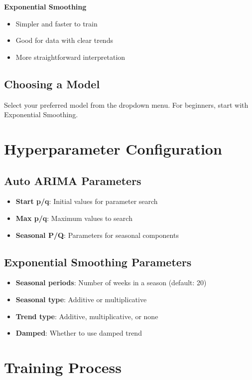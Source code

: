\textbf{Exponential Smoothing}
\begin{itemize}
	\item Simpler and faster to train
	\item Good for data with clear trends
	\item More straightforward interpretation
\end{itemize}

\subsection{Choosing a Model}
Select your preferred model from the dropdown menu. For beginners, start with Exponential Smoothing.

\section{Hyperparameter Configuration}

\subsection{Auto ARIMA Parameters}
\begin{itemize}
	\item \textbf{Start p/q}: Initial values for parameter search
	\item \textbf{Max p/q}: Maximum values to search
	\item \textbf{Seasonal P/Q}: Parameters for seasonal components
\end{itemize}

\subsection{Exponential Smoothing Parameters}
\begin{itemize}
	\item \textbf{Seasonal periods}: Number of weeks in a season (default: 20)
	\item \textbf{Seasonal type}: Additive or multiplicative
	\item \textbf{Trend type}: Additive, multiplicative, or none
	\item \textbf{Damped}: Whether to use damped trend
\end{itemize}

\section{Training Process}

